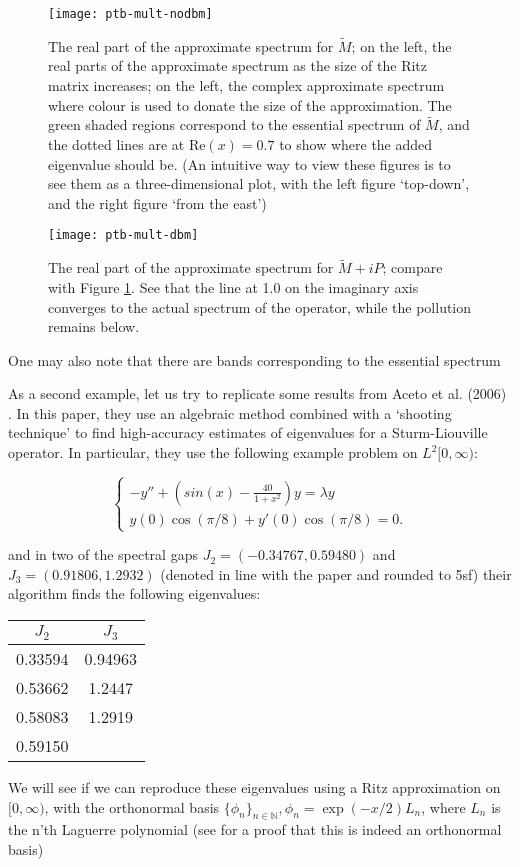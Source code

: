 \documentclass[../main.tex]{subfiles}
\begin{document}
\begin{figure}[h!]
\texttt{[image: ptb-mult-nodbm]}
\caption{The real part of the approximate spectrum for $\tilde{M}$; on the left, the real parts of the approximate spectrum as the size of the Ritz matrix increases;
on the left, the complex approximate spectrum where colour is used to donate the size of the approximation. The green shaded regions correspond to
the essential spectrum of $\tilde{M}$, and the dotted lines are at $\mathrm{Re}(x) = 0.7$ to show where the added eigenvalue should be. 
(An intuitive way to view these figures is to see them as a three-dimensional plot, with the left figure `top-down', and the right figure `from the east')}
\label{fig:nodbm}
\end{figure}

\begin{figure}[h!]
\texttt{[image: ptb-mult-dbm]} 
\caption{The real part of the approximate spectrum for $\tilde{M}+iP$; compare with Figure \ref{fig:nodbm}. See that the line at 1.0 on the imaginary
axis converges to the actual spectrum of the operator, while the pollution remains below.}
\label{fig:dbm}
\end{figure}
\clearpage

One may also note that there are bands corresponding to the essential spectrum 

\begin{example}
As a second example, let us try to replicate some results from Aceto et al. (2006) \cite{aceto2006numerical}. In this paper, they use an algebraic method
combined with a `shooting technique' to find high-accuracy estimates of eigenvalues for a Sturm-Liouville operator. 
In particular, they use the following example problem on $L^2[0, \infty)$:

$$
\begin{cases}
-y'' + (sin(x) - \frac{40}{1+x^2})y = \lambda y \\
y(0) \cos(\pi/8) + y'(0) \cos(\pi/8) = 0.
\end{cases}
$$

and in two of the spectral gaps $J_2 = (-0.34767, 0.59480)$ and $J_3 = (0.91806, 1.2932)$ (denoted in line with the paper and rounded to 5sf) their algorithm finds the following eigenvalues:

\begin{figure*}[h!]
\centering
\begin{tabular}{c c}
$J_2$ & $J_3$ \\
\hline\hline
0.33594 & 0.94963 \\
0.53662 & 1.2447 \\
0.58083 & 1.2919 \\
0.59150 & \\
\end{tabular}
\end{figure*}

We will see if we can reproduce these eigenvalues using a Ritz approximation on $[0, \infty)$, with the orthonormal basis $\{\phi_n\}_{n \in \mathbb{N}},
\phi_n = \exp(-x/2)L_n$, where $L_n$ is the n'th Laguerre polynomial (see \cite{szego1975orthogonal} for a proof that this is indeed an orthonormal basis)
\end{example}
\end{document}
